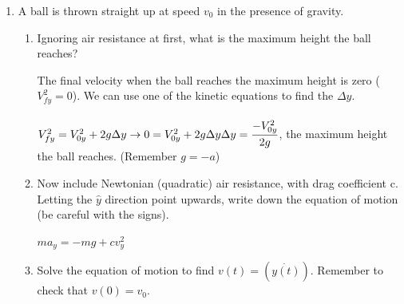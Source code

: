 \documentclass[fleqn]{article}
\begin{document}
\begin{enumerate}
\begin{enumerate}
    \end{enumerate}

    \item A ball is thrown straight up at speed $v_0$ in the presence of gravity.
    \begin{enumerate}
      \item Ignoring air resistance at first, what is the maximum height the ball reaches?

        \textcolor{hwColor}{
          The final velocity when the ball reaches the maximum height is zero ($V^2_{fy}=0$). We can use one of the kinetic equations
          to find the $\Delta y$. \\
          \\
          $
            V^2_{fy}=V^2_{0y}+2g\Delta y \rightarrow 0=V^2_{0y}+2g\Delta y \\ \\
            \Delta y=\dfrac{-V^2_{0y}}{2g}
          $, the maximum height the ball reaches. (Remember $g=-a$)
        }

      \item Now include Newtonian (quadratic) air resistance, with drag coefficient c. Letting the $\hat{y}$ direction point upwards, write down the
      equation of motion (be careful with the signs).

        \textcolor{hwColor}{
          $
            m{a_y}=-mg+cv^2_{y}
          $
        }

      \item Solve the equation of motion to find $v(t)=(\dot{y(t)})$. Remember to check that $v(0) = v_0$.


\end{enumerate}
\end{enumerate}
\end{document}
